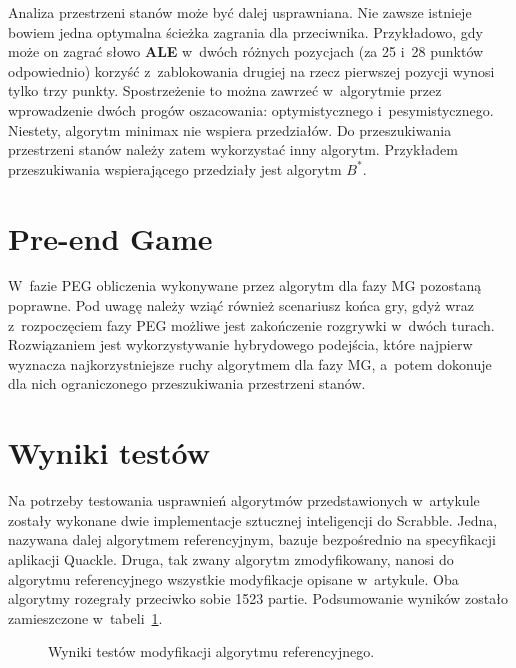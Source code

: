 \documentclass[a4paper,twocolumn,12pt]{article}
\theoremstyle{definition}
\begin{document}
Analiza przestrzeni stanów może być dalej usprawniana. Nie zawsze istnieje bowiem jedna optymalna ścieżka zagrania dla przeciwnika. Przykładowo, gdy może on zagrać słowo \textbf{ALE} w~dwóch różnych pozycjach (za 25 i~28 punktów odpowiednio) korzyść z~zablokowania drugiej na rzecz pierwszej pozycji wynosi tylko trzy punkty. Spostrzeżenie to można zawrzeć w~algorytmie przez wprowadzenie dwóch progów oszacowania: optymistycznego i~pesymistycznego. Niestety, algorytm minimax nie wspiera przedziałów. Do przeszukiwania przestrzeni stanów należy zatem wykorzystać inny algorytm. Przykładem przeszukiwania wspierającego przedziały jest algorytm $B^{*}$. \cite{bstar}

\section*{Pre-end Game}

W~fazie PEG obliczenia wykonywane przez algorytm dla fazy MG pozostaną poprawne. Pod uwagę należy wziąć również scenariusz końca gry, gdyż wraz z~rozpoczęciem fazy PEG możliwe jest zakończenie rozgrywki w~dwóch turach. Rozwiązaniem jest wykorzystywanie hybrydowego podejścia, które najpierw wyznacza najkorzystniejsze ruchy algorytmem dla fazy MG, a~potem dokonuje dla nich ograniczonego przeszukiwania przestrzeni stanów.

\section*{Wyniki testów}

Na potrzeby testowania usprawnień algorytmów przedstawionych w~artykule zostały wykonane dwie implementacje sztucznej inteligencji do Scrabble. Jedna, nazywana dalej algorytmem referencyjnym, bazuje bezpośrednio na specyfikacji aplikacji Quackle. \cite{quackle_algorithm} Druga, tak zwany algorytm zmodyfikowany, nanosi do algorytmu referencyjnego wszystkie modyfikacje opisane w~artykule. Oba algorytmy rozegrały przeciwko sobie 1523 partie. Podsumowanie wyników zostało zamieszczone w~tabeli~\ref{tab:test_results}.

\begin{figure}[ht!]
	\centering
	\caption{Wyniki testów modyfikacji algorytmu referencyjnego.}
	\label{tab:test_results}
\end{figure}
\end{document}

